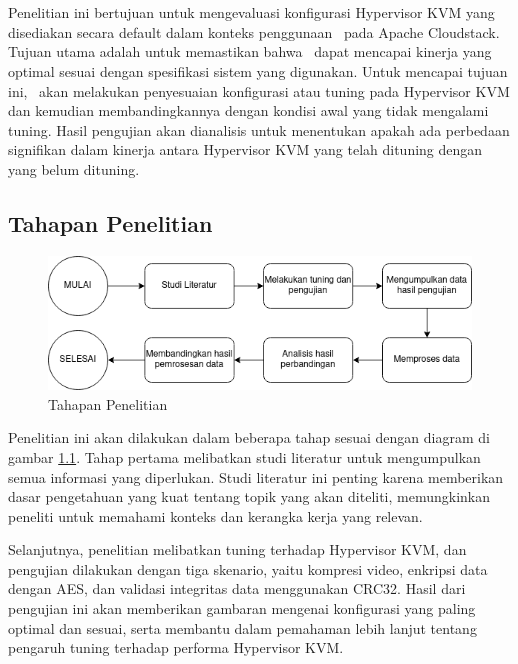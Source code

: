\chapter{\babTiga}
Penelitian ini bertujuan untuk mengevaluasi konfigurasi Hypervisor KVM yang disediakan secara default dalam konteks penggunaan \vm\ pada Apache Cloudstack. Tujuan utama adalah untuk memastikan bahwa \vm\ dapat mencapai kinerja yang optimal sesuai dengan spesifikasi sistem yang digunakan. Untuk mencapai tujuan ini, \saya\ akan melakukan penyesuaian konfigurasi atau tuning pada Hypervisor KVM dan kemudian membandingkannya dengan kondisi awal yang tidak mengalami tuning. Hasil pengujian akan dianalisis untuk menentukan apakah ada perbedaan signifikan dalam kinerja antara Hypervisor KVM yang telah dituning dengan yang belum dituning.

\section{Tahapan Penelitian}
\begin{figure}
    \centering
    \includegraphics[width=1\textwidth]
    {assets/pics/tahapan-penelitian.png}
    \caption{Tahapan Penelitian}
    \label{fig:TahapanPenelitian}
\end{figure}

Penelitian ini akan dilakukan dalam beberapa tahap sesuai dengan diagram di gambar \ref{fig:TahapanPenelitian}. Tahap pertama melibatkan studi literatur untuk mengumpulkan semua informasi yang diperlukan. Studi literatur ini penting karena memberikan dasar pengetahuan yang kuat tentang topik yang akan diteliti, memungkinkan peneliti untuk memahami konteks dan kerangka kerja yang relevan.

Selanjutnya, penelitian melibatkan tuning terhadap Hypervisor KVM, dan pengujian dilakukan dengan tiga skenario, yaitu kompresi video, enkripsi data dengan AES, dan validasi integritas data menggunakan CRC32. Hasil dari pengujian ini akan memberikan gambaran mengenai konfigurasi yang paling optimal dan sesuai, serta membantu dalam pemahaman lebih lanjut tentang pengaruh tuning terhadap performa Hypervisor KVM.

